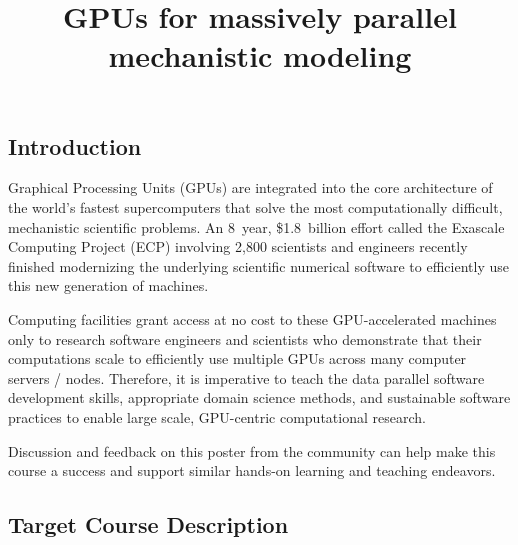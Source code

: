 \documentclass{article}
\title{GPUs for massively parallel mechanistic modeling}
\newcommand{\sectionbox}[1]{%
  \begin{tcolorbox}[sharp corners,boxrule=0pt,colback=fh-blue,coltext=fh-gold]%
    \section*{#1\vphantom{Yy}}%
  \end{tcolorbox}%
}
\begin{document}
\begin{multicols}{2}

  \sectionbox{Introduction}%
  \noindent
  Graphical Processing Units (GPUs) %
  are integrated into the core architecture %
  of the world's fastest supercomputers %
  that solve the most computationally difficult, %
  mechanistic scientific problems.
  An 8~year, \$1.8~billion effort %
  called the Exascale Computing Project (ECP) %
  involving 2,800 scientists and engineers %
  recently finished modernizing %
  the underlying scientific numerical software %
  to efficiently use this new generation of machines.
  \medskip

  Computing facilities grant access at no cost %
  to these GPU-accelerated%
  \supercite{%
    carter_2014,%
    beckingsale_2019,%
    reinders_2023%
  } machines %
  only to research software engineers and scientists who demonstrate that %
  their computations scale %
  to efficiently use multiple GPUs across many computer servers / nodes.
  Therefore, %
  it is imperative to teach %
  the data parallel software development skills, %
  appropriate domain science methods, and %
  sustainable software practices %
  to enable large scale, GPU-centric computational research.
  \medskip

  Discussion and feedback on this poster from the community %
  can help make this course a success and %
  support similar hands-on learning and teaching endeavors.
  \vspace{\baselineskip}


  \subsection*{\textcolor{fh-blue}{Target Course Description}}


\end{multicols}
\end{document}
